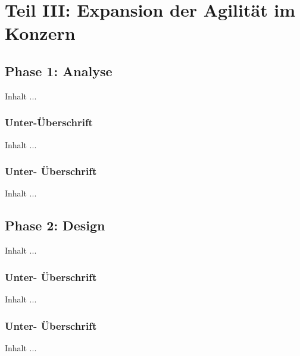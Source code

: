 
\chapter{Teil III: Expansion der Agilit\"at im Konzern}
\minitoc 


\section{Phase 1: Analyse}
Inhalt ...

\subsection{Unter-\"Uberschrift}
Inhalt ...

\subsection{Unter- \"Uberschrift}
Inhalt ...


\section{Phase 2: Design}
Inhalt ...

\subsection{Unter- \"Uberschrift}
Inhalt ...

\subsection{Unter- \"Uberschrift}
Inhalt ...
